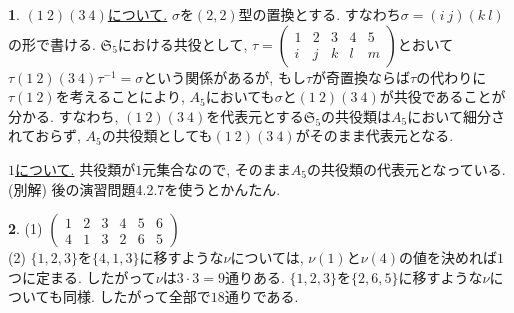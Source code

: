 \documentclass{amsart}
\theoremstyle{definition}
\newtheorem{ans}{}
\numberwithin{ans}{subsection}
\begin{document}
\begin{ans}
  \underline{$(1\ 2)(3\ 4)$について.}
  $\sigma$を$(2, 2)$型の置換とする. すなわち$\sigma = (i\ j)(k\ l)$の形で書ける.
  $\mathfrak{S}_5$における共役として,
  $\tau = \begin{pmatrix*}
    1 & 2 & 3 & 4 & 5 \\
    i & j & k & l & m
  \end{pmatrix*}$とおいて$\tau(1\ 2)(3\ 4)\tau^{-1} = \sigma$という関係があるが,
  もし$\tau$が奇置換ならば$\tau$の代わりに$\tau(1\ 2)$を考えることにより,
  $A_5$においても$\sigma$と$(1\ 2)(3\ 4)$が共役であることが分かる.
  すなわち, $(1\ 2)(3\ 4)$を代表元とする$\mathfrak{S}_5$の共役類は$A_5$において細分されておらず, $A_5$の共役類としても$(1\ 2)(3\ 4)$がそのまま代表元となる.

  \underline{$1$について.} 共役類が$1$元集合なので, そのまま$A_5$の共役類の代表元となっている.\\
  (別解) 後の演習問題4.2.7を使うとかんたん.
\end{ans}

\begin{ans}
  (1) $\begin{pmatrix*}
    1 & 2 & 3 & 4 & 5 & 6 \\
    4 & 1 & 3 & 2 & 6 & 5
  \end{pmatrix*}$\\
  (2) $\{1, 2, 3\}$を$\{4, 1, 3\}$に移すような$\nu$については,
  $\nu(1)$と$\nu(4)$の値を決めれば$1$つに定まる. したがって$\nu$は$3 \cdot 3 = 9$通りある.
  $\{1, 2, 3\}$を$\{2, 6, 5\}$に移すような$\nu$についても同様. したがって全部で$18$通りである.
\end{ans}
\end{document}

